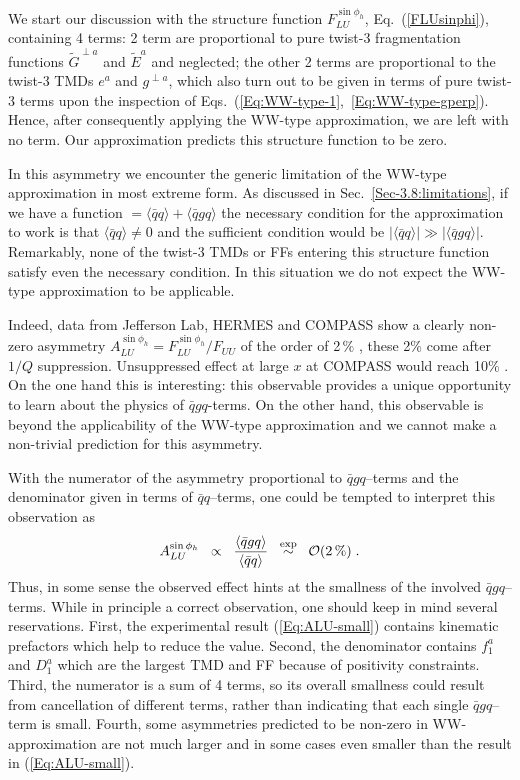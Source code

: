 \documentclass[a4paper,11pt]{article}
\newcommand{\red}[1]{{\color{red} #1}}
\newcommand{\be}{\begin{equation}}
\newcommand{\ee}{\end{equation}}
\newcommand{\la}{\langle}
\newcommand{\ra}{\rangle}
\newcommand{\AP}[1]{\red{#1}}
\begin{document}
We start our discussion with the structure function $F_{LU}^{\sin\phi_h}$,
Eq.~(\ref{FLUsinphi}), containing 4 terms: 
2 term are proportional to pure twist-3 fragmentation functions 
$\tilde{G}^{\perp a}$ and $\tilde{E}^a$ and neglected; the other 2
terms are proportional to the twist-3 TMDs $e^a$ and $g^{\perp a}$, which
also turn out to be given in terms of pure twist-3 terms upon the 
inspection of Eqs.~(\ref{Eq:WW-type-1},~\ref{Eq:WW-type-gperp}).
Hence, after consequently applying the WW-type approximation, we are left 
with no term. Our approximation predicts this structure function to be zero.

In this asymmetry we encounter the generic limitation of the 
WW-type approximation in most extreme form. As discussed in 
Sec.~\ref{Sec-3.8:limitations}, if we have a function
$=\la\bar{q}q\ra + \la\bar{q}gq\ra$ the necessary condition for 
the approximation to work is that $\la\bar{q}q\ra \neq 0$ and the 
sufficient condition would be $|\la\bar{q}q\ra|\gg|\la\bar{q}gq\ra|$.
Remarkably, none of the twist-3 TMDs or FFs entering this structure 
function satisfy even the necessary condition. In this situation we 
do not expect the WW-type approximation to be applicable. 

Indeed, data from Jefferson Lab, HERMES and COMPASS show a clearly non-zero 
asymmetry $A_{LU}^{\sin\phi_h} = F_{LU}^{\sin\phi_h}/F_{UU}$ of the order of 2\,$\%$ 
\cite{Avakian:2003pk,Airapetian:2006rx,Gohn:2009zz,
Aghasyan:2011ha,Adolph:2014pwc,Gohn:2014zbz}, \AP{these 2\% come after $1/Q$ suppression. Unsuppressed effect at large $x$ at COMPASS would reach 10\% \cite{private}.} 
On the one hand this is interesting: this observable provides a unique 
opportunity to learn about the physics of $\bar{q}gq$-terms. On the other
hand, this observable is beyond the applicability of the WW-type approximation
and we cannot make a non-trivial prediction for this asymmetry.

With the numerator of the asymmetry proportional to $\bar{q}gq$--terms
and the denominator given in terms of $\bar{q} q$--terms, one could be 
tempted to interpret this observation as
\be\label{Eq:ALU-small}
    	A_{LU}^{\sin\phi_h}
	\;\; \propto \;\;\frac{\la\bar{q}gq\ra}{\la\bar{q}q\ra}
    	\;\;\stackrel{\rm exp}{\sim} \;\; 
	{\cal O}(2\,\%)
    	\;.
\ee
Thus, in some sense the observed effect hints at the smallness of the 
involved $\bar{q}gq$--terms. While in principle a correct observation,
one should keep in mind several reservations. First,
the experimental result (\ref{Eq:ALU-small})
contains kinematic prefactors which help to reduce the value. 
Second, the denominator contains $f_1^a$ and $D_1^a$ which are the
largest TMD and FF because of positivity constraints. Third, the 
numerator is a sum of 4 terms, so its overall smallness could result 
from cancellation of different terms, rather than indicating that 
each single $\bar{q}gq$--term is small. Fourth, some asymmetries 
predicted to be non-zero in WW-approximation are not much larger and 
in some cases even smaller than the result in (\ref{Eq:ALU-small}).
\end{document}
